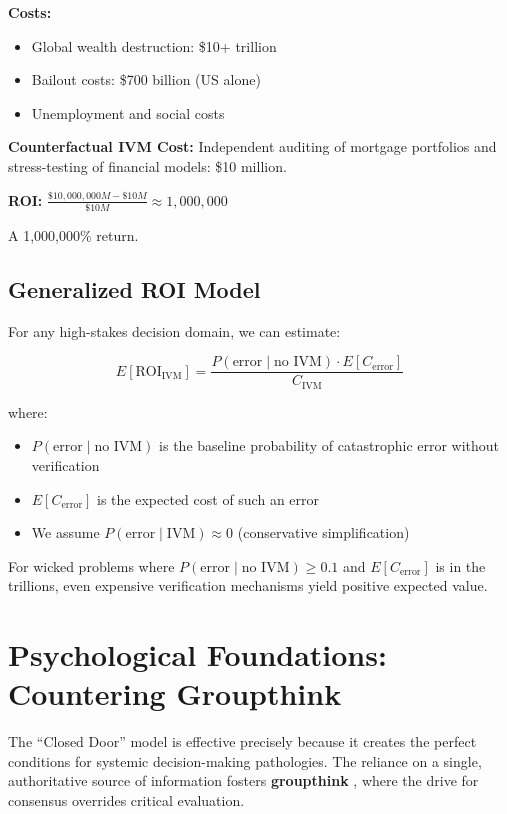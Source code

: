 \documentclass[11pt,a4paper]{article}
\begin{document}
\begin{small}
\textbf{Costs:}
\begin{itemize}
    \item Global wealth destruction: \$10+ trillion
    \item Bailout costs: \$700 billion (US alone)
    \item Unemployment and social costs
\end{itemize}

\textbf{Counterfactual IVM Cost:} Independent auditing of mortgage portfolios and stress-testing of financial models: \$10 million.

\textbf{ROI:} $\frac{\$10,000,000M - \$10M}{\$10M} \approx 1,000,000$

A 1,000,000\% return.

\subsection{Generalized ROI Model}

For any high-stakes decision domain, we can estimate:

\begin{equation}
E[\text{ROI}_{\text{IVM}}] = \frac{P(\text{error} \mid \text{no IVM}) \cdot E[C_{\text{error}}]}{C_{\text{IVM}}}
\end{equation}

where:
\begin{itemize}
    \item $P(\text{error} \mid \text{no IVM})$ is the baseline probability of catastrophic error without verification
    \item $E[C_{\text{error}}]$ is the expected cost of such an error
    \item We assume $P(\text{error} \mid \text{IVM}) \approx 0$ (conservative simplification)
\end{itemize}

For wicked problems where $P(\text{error} \mid \text{no IVM}) \geq 0.1$ and $E[C_{\text{error}}]$ is in the trillions, even expensive verification mechanisms yield positive expected value.

\section{Psychological Foundations: Countering Groupthink}

The ``Closed Door'' model is effective precisely because it creates the perfect conditions for systemic decision-making pathologies. The reliance on a single, authoritative source of information fosters \textbf{groupthink} \citep{Janis1982}, where the drive for consensus overrides critical evaluation.


\end{small}
\end{document}
